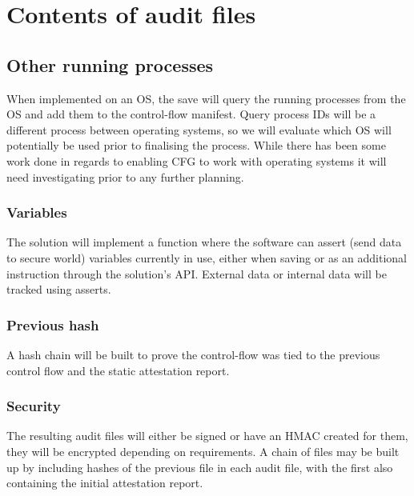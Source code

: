 \section{Contents of audit files}

\subsection{Other running processes}

When implemented on an OS, the save will query the running processes from the OS and add them to the control-flow manifest. Query process IDs will be a different process between operating systems, so we will evaluate which OS will potentially be used prior to finalising the process. While there has been some work done in regards to enabling CFG to work with operating systems it will need investigating prior to any further planning.

\subsubsection*{Variables}

The solution will implement a function where the software can assert (send data to secure world) variables currently in use, either when saving or as an additional instruction through the solution's API. External data or internal data will be tracked using asserts.

\subsubsection*{Previous hash}

A hash chain will be built to prove the control-flow was tied to the previous control flow and the static attestation report.

\subsubsection*{Security}

The resulting audit files will either be signed or have an HMAC created for them, they will be encrypted depending on requirements. A chain of files may be built up by including hashes of the previous file in each audit file, with the first also containing the initial attestation report.